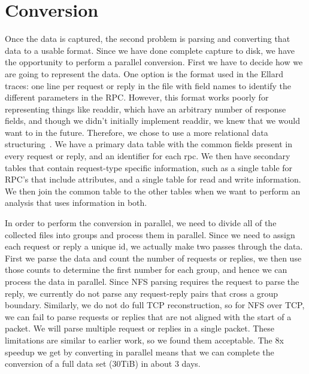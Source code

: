 \section{Conversion}

Once the data is captured, the second problem is parsing and
converting that data to a usable format.  Since we have done complete
capture to disk, we have the opportunity to perform a parallel
conversion.  First we have to decide how we are going to represent the
data.  One option is the format used in the Ellard\cite{ellardTraces}
traces: one line per request or reply in the file with field names to
identify the different parameters in the RPC.  However, this format
works poorly for representing things like readdir, which have an
arbitrary number of response fields, and though we didn't initially
implement readdir, we knew that we would want to in the future.
Therefore, we chose to use a more relational data
structuring~\cite{codd70relational}.  We have a primary data table
with the common fields present in every request or reply, and an
identifier for each rpc.  We then have secondary tables that contain
request-type specific information, such as a single table for RPC's
that include attributes, and a single table for read and write
information.  We then join the common table to the other tables when
we want to perform an analysis that uses information in both.

In order to perform the conversion in parallel, we need to divide all
of the collected files into groups and process them in parallel.
Since we need to assign each request or reply a unique id, we actually
make two passes through the data.  First we parse the data and count
the number of requests or replies, we then use those counts to
determine the first number for each group, and hence we can process
the data in parallel.  Since NFS parsing requires the request to parse
the reply, we currently do not parse any request-reply pairs that
cross a group boundary.  Similarly, we do not do full TCP
reconstruction, so for NFS over TCP, we can fail to parse requests or
replies that are not aligned with the start of a packet.  We will
parse multiple request or replies in a single packet.  These
limitations are similar to earlier work, so we found them acceptable.
The 8x speedup we get by converting in parallel means that we can
complete the conversion of a full data set (30TiB) in about 3 days.

